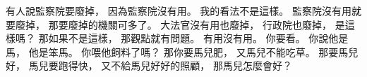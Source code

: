 \hypertarget{w01:cue:3037}{}有人說監察院要廢掉，
\hypertarget{w01:cue:3038}{}因為監察院沒有用。
\hypertarget{w01:cue:3039}{}我的看法不是這樣。
\hypertarget{w01:cue:3040}{}監察院沒有用就要廢掉，
\hypertarget{w01:cue:3041}{}那要廢掉的機關可多了。
\hypertarget{w01:cue:3042}{}大法官沒有用也廢掉，
\hypertarget{w01:cue:3043}{}行政院也廢掉，
\hypertarget{w01:cue:3044}{}是這樣嗎？
\hypertarget{w01:cue:3045}{}那如果不是這樣，
\hypertarget{w01:cue:3046}{}那觀點就有問題。
\hypertarget{w01:cue:3047}{}有用沒有用。
\hypertarget{w01:cue:3048}{}你要看。
\hypertarget{w01:cue:3049}{}你說他是馬，
\hypertarget{w01:cue:3050}{}他是笨馬。
\hypertarget{w01:cue:3051}{}你喂他飼料了嗎？
\hypertarget{w01:cue:3052}{}那你要馬兒肥，
\hypertarget{w01:cue:3053}{}又馬兒不能吃草。
\hypertarget{w01:cue:3054}{}那要馬兒好，
\hypertarget{w01:cue:3055}{}馬兒要跑得快，
\hypertarget{w01:cue:3056}{}又不給馬兒好好的照顧，
\hypertarget{w01:cue:3057}{}那馬兒怎麼會好？

